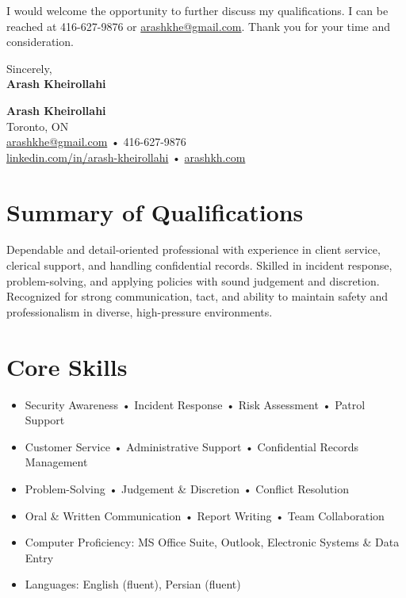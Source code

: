 \documentclass[letterpaper,10pt]{article}
\begin{document}
I would welcome the opportunity to further discuss my qualifications. I can be reached at 416-627-9876 or \href{mailto:arashkhe@gmail.com}{arashkhe@gmail.com}. Thank you for your time and consideration.

\vspace{2em}
Sincerely,\\[2em]

\textbf{Arash Kheirollahi}

\newpage


{\LARGE \textbf{Arash Kheirollahi}}\\[0.2em]
Toronto, ON \\
\href{mailto:arashkhe@gmail.com}{arashkhe@gmail.com} • 416-627-9876 \\
\href{https://linkedin.com/in/arash-kheirollahi}{linkedin.com/in/arash-kheirollahi} • \href{https://www.arashkh.com}{arashkh.com}

\vspace{0.8em}

\section*{Summary of Qualifications}
Dependable and detail-oriented professional with experience in client service, clerical support, and handling confidential records. Skilled in incident response, problem-solving, and applying policies with sound judgement and discretion. Recognized for strong communication, tact, and ability to maintain safety and professionalism in diverse, high-pressure environments.

\section*{Core Skills}
\begin{itemize}[leftmargin=*]
  \item Security Awareness • Incident Response • Risk Assessment • Patrol Support
  \item Customer Service • Administrative Support • Confidential Records Management
  \item Problem-Solving • Judgement \& Discretion • Conflict Resolution
  \item Oral \& Written Communication • Report Writing • Team Collaboration
  \item Computer Proficiency: MS Office Suite, Outlook, Electronic Systems \& Data Entry
  \item Languages: English (fluent), Persian (fluent)
\end{itemize}
\end{document}
